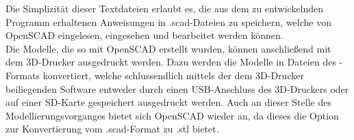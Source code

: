 Die Simplizität dieser Textdateien erlaubt es, die aus dem zu entwickelnden Programm erhaltenen Anweisungen in .scad-Dateien zu speichern, welche von OpenSCAD eingelesen, eingesehen und bearbeitet werden können. \\
Die Modelle, die so mit OpenSCAD erstellt wurden, können anschließend mit dem 3D-Drucker ausgedruckt werden.
Dazu werden die Modelle in Dateien des -Formats konvertiert, welche schlussendlich mittels der dem 3D-Drucker beiliegenden Software entweder durch einen USB-Anschluss des 3D-Druckers oder auf einer SD-Karte gespeichert ausgedruckt werden.
Auch an dieser Stelle des Modellierungsvorganges bietet sich OpenSCAD wieder an, da dieses die Option zur Konvertierung vom .scad-Format zu .stl bietet.

